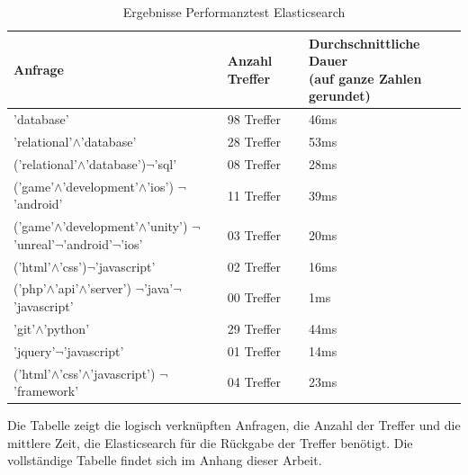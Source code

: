 \documentclass[a4paper]{scrartcl}
\begin{document}
\begin{table}[htb]
	\centering
	\caption{Ergebnisse Performanztest Elasticsearch}
	\begin{center}
		
		\begin{tabular}{| l | l | l |}
			\hline
			Anfrage & Anzahl Treffer & \makecell[l]{Durchschnittliche Dauer \\ (auf ganze Zahlen gerundet)} \\ [0.5ex]
			\hline \hline
			'database' & 98 Treffer & 46ms \\
			\hline
			'relational'$\land$'database' & 28 Treffer & 53ms \\
			\hline
			('relational'$\land$'database')$\neg$'sql' & 08 Treffer & 28ms \\
			\hline
			\makecell[l]{('game'$\land$'development'$\land$'ios') \\ $\neg$'android'} & 11 Treffer & 39ms \\
			\hline
			\makecell[l]{('game'$\land$'development'$\land$'unity') \\ $\neg$'unreal'$\neg$'android'$\neg$'ios'} & 03 Treffer & 20ms \\
			\hline
			('html'$\land$'css')$\neg$'javascript' & 02 Treffer & 16ms \\
			\hline
			\makecell[l]{('php'$\land$'api'$\land$'server') \\ $\neg$'java'$\neg$'javascript'} & 00 Treffer & 1ms \\
			\hline
			'git'$\land$'python' & 29 Treffer & 44ms \\
			\hline
			'jquery'$\neg$'javascript' & 01 Treffer & 14ms \\
			\hline
			\makecell[l]{('html'$\land$'css'$\land$'javascript') \\ $\neg$'framework'} & 04 Treffer & 23ms\\
			\hline
		\end{tabular}
	\end{center}
	Die Tabelle zeigt die logisch verknüpften Anfragen, die Anzahl der Treffer und die mittlere Zeit, die Elasticsearch für die Rückgabe der Treffer benötigt. Die vollständige Tabelle findet sich im Anhang dieser Arbeit.
\end{table} 

\newpage
\end{document}
